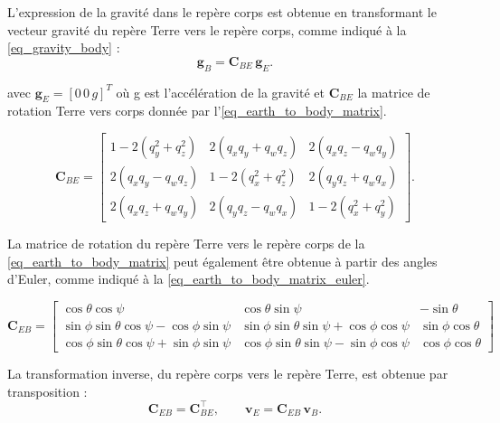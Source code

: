 \documentclass[11pt,a4paper,oneside]{report}
\begin{document}
	L'expression de la gravité dans le repère corps est obtenue en transformant le vecteur gravité du repère Terre vers le repère corps, comme indiqué à la \cref{eq_gravity_body} : 
	\begin{equation}
		\mathbf{g}_B=\mathbf{C}_{BE}\,\mathbf{g}_E.
		\label{eq_gravity_body}
	\end{equation}
	
	avec \(\mathbf{g}_E = [0\, 0\, g]^T\) où g est l'accélération de la gravité et \(\mathbf{C}_{BE}\) la matrice de rotation Terre vers corps donnée par l'\cref{eq_earth_to_body_matrix}.
	
	\begin{equation}
		\mathbf{C}_{BE}
		=
		\begin{bmatrix}
			1-2\left(q_y^2+q_z^2\right) &
			2\left(q_xq_y+q_wq_z\right) &
			2\left(q_xq_z-q_wq_y\right)
			\\
			2\left(q_xq_y-q_wq_z\right) &
			1-2\left(q_x^2+q_z^2\right) &
			2\left(q_yq_z+q_wq_x\right)
			\\
			2\left(q_xq_z+q_wq_y\right) &
			2\left(q_yq_z-q_wq_x\right) &
			1-2\left(q_x^2+q_y^2\right)
		\end{bmatrix}.
		\label{eq_earth_to_body_matrix}
	\end{equation}
	
	La matrice de rotation du repère Terre vers le repère corps de la \cref{eq_earth_to_body_matrix} peut également être obtenue à partir des angles d'Euler, comme indiqué à la \cref{eq_earth_to_body_matrix_euler}.
	
	\begin{equation}
		\mathbf{C}_{EB}
		=
		\begin{bmatrix}
			\cos\theta\cos\psi
			&
			\cos\theta\sin\psi
			&
			-\sin\theta
			\\
			\sin\phi\sin\theta\cos\psi-\cos\phi\sin\psi
			&
			\sin\phi\sin\theta\sin\psi+\cos\phi\cos\psi
			&
			\sin\phi\cos\theta
			\\
			\cos\phi\sin\theta\cos\psi+\sin\phi\sin\psi
			&
			\cos\phi\sin\theta\sin\psi-\sin\phi\cos\psi
			&
			\cos\phi\cos\theta
		\end{bmatrix}
		\label{eq_earth_to_body_matrix_euler}
	\end{equation}
	
	
	
	La transformation inverse, du repère corps vers le repère Terre, est obtenue par transposition :
	\begin{equation}
		\mathbf{C}_{EB}
		=
		\mathbf{C}_{BE}^{\top},
		\qquad
		\mathbf{v}_E
		=
		\mathbf{C}_{EB}\,\mathbf{v}_B.
		\label{eq_body_to_earth_matrix}
	\end{equation}
	
\end{document}
